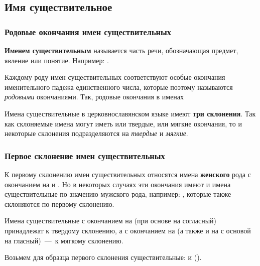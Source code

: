 \documentclass[11pt,a4paper,oneside]{memoir}
\begin{document}
            \subsection{Имя существительное}
                \subsubsection{Родовые окончания имен существительных}

    \textbf{Именем существительным} называется часть речи, обозначающая предмет, явление или понятие. Например: {}.
    
    Каждому роду имен существительных соответствуют особые окончания именительного падежа единственного числа, которые поэтому называются \emph{родовыми} окончаниями. Так, родовые окончания в именах
    
    \bigskip{}

    Имена существительные в церковнославянском языке имеют \textbf{три склонения}. Так как склоняемые имена могут иметь или твердые, или мягкие окончания, то и некоторые склонения подразделяются на \emph{твердые} и \emph{мягкие}.

                \subsubsection{Первое склонение имен существительных}

    К первому склонению имен существительных относятся имена \textbf{женского} рода с окончанием на {} и {}. Но в некоторых случаях эти окончания имеют и имена существительные по значению мужского рода, например: {}, которые также склоняются по первому склонению.
    
    Имена существительные с окончанием на {} (при основе на согласный) принадлежат к твердому склонению, а с окончанием на {} (а также и на {} с основой на гласный)~---~к мягкому склонению.
    
    Возьмем для образца первого склонения существительные: {} и {} ({}).
    
\end{document}
